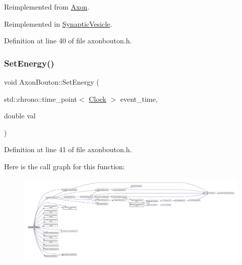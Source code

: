 Reimplemented from \hyperlink{class_axon_a3493cb97bde26bd66facc6084cd5f219}{Axon}.



Reimplemented in \hyperlink{class_synaptic_vesicle_a7fd7cfce5eccb904206d968866f85220}{Synaptic\+Vesicle}.



Definition at line 40 of file axonbouton.\+h.

\mbox{\label{class_axon_bouton_ab24fa467ab7221d0577e54734684a491}} 
\subsubsection{\texorpdfstring{Set\+Energy()}{SetEnergy()}}
{\footnotesize\ttfamily void Axon\+Bouton\+::\+Set\+Energy (\begin{DoxyParamCaption}\item[{std\+::chrono\+::time\+\_\+point$<$ \hyperlink{universe_8h_a0ef8d951d1ca5ab3cfaf7ab4c7a6fd80}{Clock} $>$}]{event\+\_\+time,  }\item[{double}]{val }\end{DoxyParamCaption})\hspace{0.3cm}{\ttfamily [inline]}}



Definition at line 41 of file axonbouton.\+h.

Here is the call graph for this function\+:
\nopagebreak
\begin{figure}[H]
\begin{center}
\leavevmode
\includegraphics[width=350pt]{class_axon_bouton_ab24fa467ab7221d0577e54734684a491_cgraph}
\end{center}
\end{figure}
\mbox{\label{class_axon_bouton_a26f89bac681b8f0894fe1ae249733917}} 
